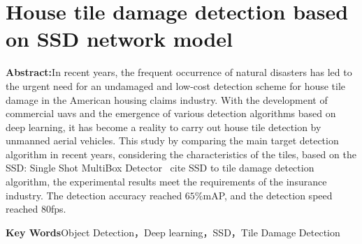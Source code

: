 \section*{House tile damage detection based on SSD network model}
\par \noindent
\textbf{\songti {}Abstract:}In recent years, the frequent occurrence of natural disasters has led to the urgent need for an undamaged and low-cost detection scheme for house tile damage in the American housing claims industry. With the development of commercial uavs and the emergence of various detection algorithms based on deep learning, it has become a reality to carry out house tile detection by unmanned aerial vehicles. This study by comparing the main target detection algorithm in recent years, considering the characteristics of the tiles, based on the SSD: Single Shot MultiBox Detector \ cite {SSD} to tile damage detection algorithm, the experimental results meet the requirements of the insurance industry. The detection accuracy reached $65\%$mAP, and the detection speed reached 80fps.

\par \noindent
\textbf{\songti {}Key Words}{\kaishu {}Object Detection，Deep learning，SSD，Tile Damage Detection}
